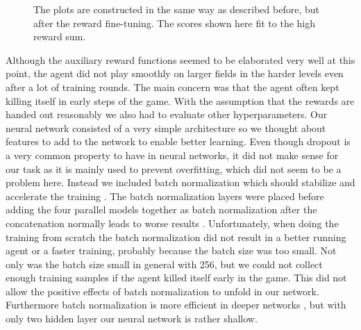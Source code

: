 \begin{figure}[H]
\begin{minipage}{0.49\textwidth}
	\end{minipage}
	\caption{The plots are constructed in the same way as described before, but after the reward fine-tuning. The scores shown here fit to the high reward sum.}
	\label{fig:efficientCoinHeaven}
\end{figure}

Although the auxiliary reward functions seemed to be elaborated very well at this point, the agent did not play smoothly on larger fields in the harder levels even after a lot of training rounds. The main concern was that the agent often kept killing itself in early steps of the game. With the assumption that the rewards are handed out reasonably we also had to evaluate other hyperparameters. Our neural network consisted of a very simple architecture so we thought about features to add to the network to enable better learning. Even though dropout is a very common property to have in neural networks, it did not make sense for our task as it is mainly used to prevent overfitting, which did not seem to be a problem here. Instead we included batch normalization which should stabilize and accelerate the training \cite{batchnorm}. The batch normalization layers were placed before adding the four parallel models together as batch normalization after the concatenation normally leads to worse results \cite{batchnormpos}. Unfortunately, when doing the training from scratch the batch normalization did not result in a better running agent or a faster training, probably because the batch size was too small. Not only was the batch size small in general with 256, but we could not collect enough training samples if the agent killed itself early in the game. This did not allow the positive effects of batch normalization to unfold in our network. Furthermore batch normalization is more efficient in deeper networks \cite{batchnorm}, but with only two hidden layer our neural network is rather shallow.

